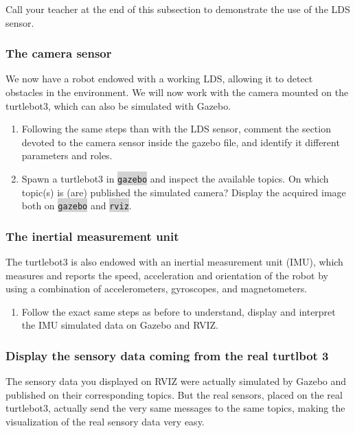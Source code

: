 \documentclass[10pt,a4paper]{upmc}
\newcounter{mainmemorder}
\newcommand{\save}{\setcounter{mainmemorder}{\value{enumi}}}
\newcommand{\load}{\setcounter{enumi}{\value{mainmemorder}}}
\newcommand{\mytext}[1]{\colorbox{lightgray}{\texttt{#1}}}
\begin{document}
\begin{mdframed}[style=evaluation]
  Call your teacher at the end of this subsection to demonstrate the use of the LDS sensor.
\end{mdframed}

\subsubsection{The camera sensor}
We now have a robot endowed with a working LDS, allowing it to detect obstacles in the environment.
We will now work with the camera mounted on the turtlebot3, which can also be simulated with Gazebo.

\begin{enumerate}
  \load
  \item Following the same steps than with the LDS sensor, comment the section devoted to the camera
        sensor inside the gazebo file, and identify it different parameters and roles.

  \item Spawn a turtlebot3 in \mytext{gazebo} and inspect the available topics. On which topic(s) is
        (are) published the simulated camera? Display the acquired image both on \mytext{gazebo} and
        \mytext{rviz}.
  \save
\end{enumerate}

\subsubsection{The inertial measurement unit}

The turtlebot3 is also endowed with an inertial measurement unit (IMU), which measures and reports
the speed, acceleration and orientation of the robot by using a combination of accelerometers,
gyroscopes, and magnetometers.

\begin{enumerate}
  \load
  \item Follow the exact same steps as before to understand, display and interpret the IMU simulated
        data on Gazebo and RVIZ.
  \save
\end{enumerate}

\subsubsection{Display the sensory data coming from the real turtlbot 3}
The sensory data you displayed on RVIZ were actually simulated by Gazebo and published on their
corresponding topics. But the real sensors, placed on the real turtlebot3, actually send the very
same messages to the same topics, making the visualization of the real sensory data very easy.
\end{document}
